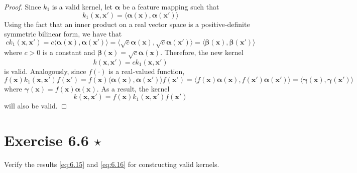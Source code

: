 \vspace{1em}

\begin{proof}
    Since $k_1$ is a valid kernel, let $\bm{\alpha}$ be
    a feature mapping such that
    \[
        k_1(\mathbf{x}, \mathbf{x}') 
        = \langle \bm{\alpha}(\mathbf{x}), \bm{\alpha}(\mathbf{x}') \rangle
    \] 
    Using the fact that an inner product on a real vector space is a 
    positive-definite symmetric bilinear form, we have that
    \[
        ck_1(\mathbf{x}, \mathbf{x}')
        = c \langle \bm{\alpha}(\mathbf{x}), \bm{\alpha}(\mathbf{x}') \rangle
        = \langle \sqrt{c} \bm{\alpha}(\mathbf{x}), \sqrt{c} \bm{\alpha}(\mathbf{x}') \rangle
        = \langle \bm{\beta}(\mathbf{x}), \bm{\beta}(\mathbf{x}') \rangle
    \] 
    where $c > 0$ is a constant and $\bm{\beta}(\mathbf{x}) = \sqrt{c}\bm{\alpha}(\mathbf{x})$.
    Therefore, the new kernel 
    \begin{equation*}
        k(\mathbf{x}, \mathbf{x}') = ck_1(\mathbf{x}, \mathbf{x}')
        \tag{6.13}\label{eq:6.13}
    \end{equation*}
    is valid. Analogously, since $f(\cdot)$ is a real-valued function, 
    \[
        f(\mathbf{x}) k_1(\mathbf{x}, \mathbf{x}') f(\mathbf{x}')
        = f(\mathbf{x}) \langle \bm{\alpha}(\mathbf{x}), \bm{\alpha}(\mathbf{x}') \rangle
        f(\mathbf{x}')
        = \langle f(\mathbf{x}) \bm{\alpha}(\mathbf{x}), f(\mathbf{x}') \bm{\alpha}(\mathbf{x}')
        \rangle
        = \langle \bm{\gamma}(\mathbf{x}), \bm{\gamma}(\mathbf{x}') \rangle
    \] 
    where $\bm{\gamma}(\mathbf{x}) = f(\mathbf{x}) \bm{\alpha}(\mathbf{x})$.
    As a result, the kernel
    \begin{equation*}
        k(\mathbf{x}, \mathbf{x}') = f(\mathbf{x}) k_1(\mathbf{x}, \mathbf{x}') f(\mathbf{x}')
        \tag{6.14}\label{eq:6.14}
    \end{equation*}
    will also be valid.
\end{proof}

\section*{Exercise 6.6 $\star$}
Verify the results \eqref{eq:6.15} and \eqref{eq:6.16} for constructing valid kernels.

\vspace{1em}

